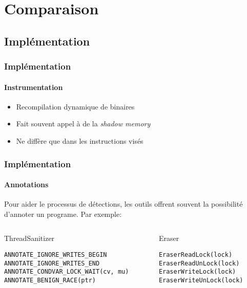 \documentclass{beamer}
\begin{document}
\section{Comparaison}
\subsection{Implémentation}
\begin{frame}
\frametitle{Implémentation}
\framesubtitle{Instrumentation}
\begin{itemize}
\item Recompilation dynamique de binaires
\item Fait souvent appel à de la \textit{shadow memory}
\item Ne diffère que dans les instructions visés
\end{itemize}
\end{frame}

\begin{frame}[fragile]
\frametitle{Implémentation}
\framesubtitle{Annotations}
Pour aider le processus de détections, les outils offrent souvent la possibilité d'annoter un programe. Par exemple: 
\begin{columns}
    \begin{column}{0.6\textwidth}
    \begin{center}
ThreadSanitizer  
    \end{center}
    \footnotesize{
    \begin{lstlisting}
ANNOTATE_IGNORE_WRITES_BEGIN
ANNOTATE_IGNORE_WRITES_END
ANNOTATE_CONDVAR_LOCK_WAIT(cv, mu)
ANNOTATE_BENIGN_RACE(ptr)
\end{lstlisting}}
    \end{column}
    \begin{column}{0.4\textwidth}
    \begin{center}
Eraser    
    \end{center}
    \footnotesize{
    \begin{lstlisting}
EraserReadLock(lock)
EraserReadUnLock(lock)
EraserWriteLock(lock)
EraserWriteUnLock(lock)
\end{lstlisting}}
    \end{column}
\end{columns}
\end{frame}
\end{document}
